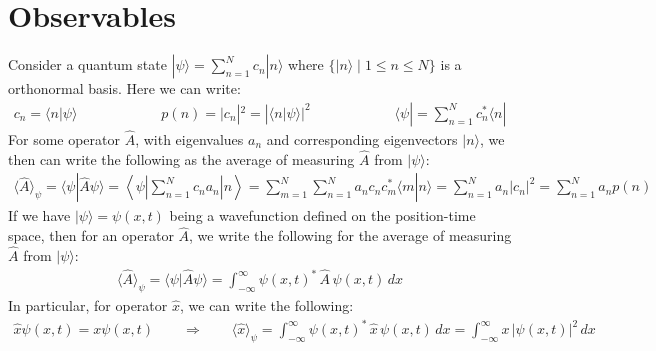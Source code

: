 \documentclass[11pt]{book}
\theoremstyle{break}
\theoremstyle{break}
\begin{document}
\newpage
\section[Observables]{\color{red} Observables\color{black}}
Consider a quantum state $|\psi\rangle = \sum_{n=1}^N c_n |n\rangle$ where $\{|n\rangle\mid 1\leq n \leq N\}$ is a orthonormal basis. Here we can write:
\begin{align*}
c_n = \langle n | \psi\rangle \qquad\qquad\qquad p(n) = |c_n|^2 = |\langle n| \psi	\rangle|^2 \qquad\qquad\qquad \langle \psi |= \sum_{n=1}^N c_n^* \langle n|
\end{align*}
For some operator $\hat{A}$, with eigenvalues $a_n$ and corresponding eigenvectors $|n\rangle$, we then can write the following as the average of measuring $\hat{A}$ from $|\psi\rangle$:
\begin{align*}
\langle \hat{A} \rangle_{\psi} = \langle \psi | \hat{A} \psi\rangle = \left\langle \psi \left|\left. \sum_{n=1}^N c_n a_n \right.\right| n \right\rangle = \sum_{m=1}^N \sum_{n=1}^N a_nc_nc_m^*\langle m|n\rangle = \sum_{n=1}^{N}a_n |c_n|^2 = \sum_{n=1}^N a_n p(n)
\end{align*}
If we have $|\psi\rangle = \psi(x,t)$ being a wavefunction defined on the position-time space, then for an operator $\hat{A}$, we write the following for the average of measuring $\hat{A}$ from $|\psi\rangle$:
\begin{align*}
\langle \hat{A}\rangle_{\psi} = \langle \psi |\hat{A} \psi \rangle = \int_{-\infty}^{\infty}\psi(x,t)^*\, \hat{A}\,\psi(x,t)\, dx
\end{align*}
In particular, for operator $\hat{x}$, we can write the following:
\begin{align*}
\hat{x}\psi(x,t) = x\psi(x,t) \qquad \Rightarrow \qquad \langle \hat{x} \rangle_{\psi} = \int_{-\infty}^\infty \psi(x,t)^*\, \hat{x}\, \psi(x,t)\, dx = \int_{-\infty}^\infty x\, |\psi(x,t)|^2 \, dx
\end{align*}
\end{document}
